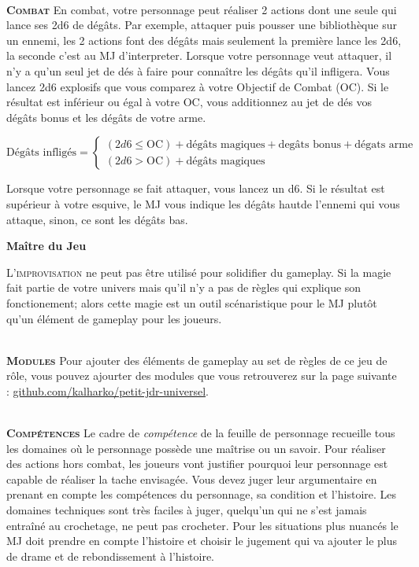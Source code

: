 \documentclass[11pt]{article} %
\newcommand{\myjump}[1][1]{\mbox{}\\[#1cm]}
\newcommand{\scbf}[1]{\textsc{\textbf{#1}}}
\newcommand{\enluminure}[2]{\lettrine[lines=3]{\small \initfamily #1}{#2}}
\begin{document}
\myjump[0]
\indent\scbf{Combat}\newline
En combat, votre personnage peut réaliser 2 actions dont une seule qui lance ses 2d6 de dégâts. Par exemple, attaquer puis pousser une bibliothèque sur un ennemi, les 2 actions font des dégâts mais seulement la première lance les 2d6, la seconde c'est au MJ d'interpreter.
Lorsque votre personnage veut attaquer, il n'y a qu'un seul jet de dés à faire pour connaître les dégâts qu'il infligera. Vous lancez 2d6 explosifs que vous comparez à votre Objectif de Combat (OC). Si le résultat est inférieur ou égal à votre OC, vous additionnez au jet de dés vos dégâts bonus et les dégâts de votre arme.

$
\mbox{Dégâts infligés} =
\left\{
    \begin{array}{ll}
        (2d6 \le \mbox{OC}) + \mbox{dégâts magiques} + \mbox{degâts bonus} + \mbox{dégats arme}\\
(2d6 > \mbox{OC}) + \mbox{dégâts magiques}
    \end{array}
\right.
$

\noindent Lorsque votre personnage se fait attaquer, vous lancez un d6. Si le résultat est supérieur à votre esquive, le MJ vous indique les dégâts \og haut\fg de l'ennemi qui vous attaque, sinon, ce sont les dégâts \og bas\fg.










\newpage
\textbf{\huge Maître du Jeu}

\enluminure{L}{'improvisation} ne peut pas être utilisé pour solidifier du gameplay. Si la magie fait partie de votre univers mais qu'il n'y a pas de règles qui explique son fonctionement; alors cette magie est un outil scénaristique pour le MJ plutôt qu'un élément de gameplay pour les joueurs.

\myjump[0]
\indent\scbf{Modules}\newline
\noindent Pour ajouter des éléments de gameplay au set de règles de ce jeu de rôle, vous pouvez ajourter des modules que vous retrouverez sur la page suivante : \href{https://github.com/kalharko/petit-jdr-universel}{github.com/kalharko/petit-jdr-universel}.



\myjump[0]
\indent\scbf{Compétences}\newline
Le cadre de \emph{compétence} de la feuille de personnage recueille tous les domaines où le personnage possède une maîtrise ou un savoir. Pour réaliser des actions hors combat, les joueurs vont justifier pourquoi leur personnage est capable de réaliser la tache envisagée. Vous devez juger leur argumentaire en prenant en compte les compétences du personnage, sa condition et l'histoire. Les domaines techniques sont très faciles à juger, quelqu'un qui ne s'est jamais entraîné au crochetage, ne peut pas crocheter. Pour les situations plus nuancés le MJ doit prendre en compte l'histoire et choisir le jugement qui va ajouter le plus de drame et de rebondissement à l'histoire.
\end{document}
